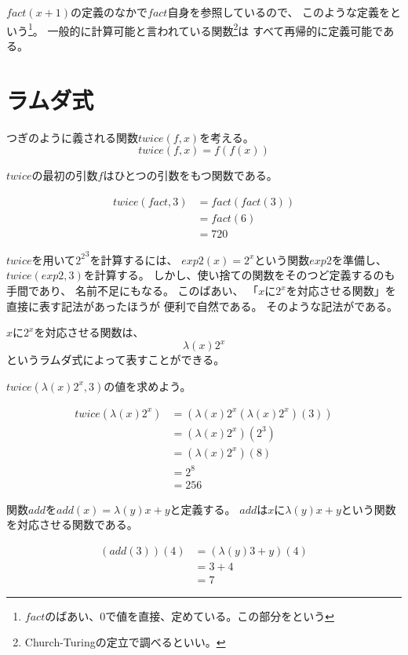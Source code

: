 \documentclass[fleqn]{jsarticle}
\begin{document}
$fact(x+1)$の定義のなかで$fact$自身を参照しているので、
このような定義をという\footnote{$fact$のばあい、$0$で値を直接、定めている。この部分をという}。
一般的に計算可能と言われている関数\footnote{Church-Turingの定立で調べるといい。}は
すべて再帰的に定義可能である。

\section{ラムダ式}

つぎのように義される関数$twice(f,x)$を考える。
\[
  twice(f,x) = f(f(x))
\]

$twice$の最初の引数$f$はひとつの引数をもつ関数である。

\begin{align*}
  twice(fact , 3) &= fact (fact (3))\\
                  &= fact(6)\\
                  &= 720
\end{align*}

$twice$を用いて${2^2}^3$を計算するには、
$exp2(x) = 2^x$という関数$exp2$を準備し、
$twice( exp2 , 3 )$を計算する。
しかし、使い捨ての関数をそのつど定義するのも手間であり、
名前不足にもなる。
このばあい、
「$x$に$2^x$を対応させる関数」を直接に表す記法があったほうが
便利で自然である。
そのような記法がである。

$x$に$2^x$を対応させる関数は、
\[ \lambda (x) 2^x \]
というラムダ式によって表すことができる。

$twice( \lambda (x) 2^x , 3)$の値を求めよう。

\begin{align*}
  twice( \lambda (x) 2^x ) &= ( \lambda (x) 2^x ( \lambda (x) 2^x )(3))\\
                           &= ( \lambda (x) 2^x ) (2^3)\\
                           &= ( \lambda (x) 2^x ) (8)\\
                           &= 2^8\\
                           &= 256
\end{align*}

関数$add$を$add (x) = \lambda (y) x+y$と定義する。
$add$は$x$に$\lambda (y) x+y$という関数を対応させる関数である。

\begin{align*}
  (add(3))(4) &= ( \lambda (y) 3 + y)(4)\\
              &= 3 + 4\\
              &= 7
\end{align*}
\end{document}

